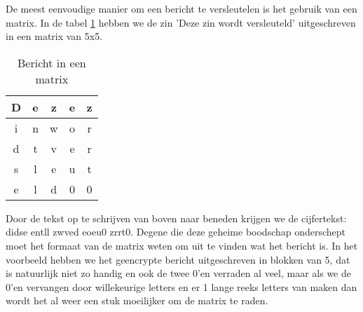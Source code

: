 De meest eenvoudige manier om een bericht te versleutelen is het gebruik van een matrix. In de tabel \ref{tab:matrix} hebben we de zin 'Deze zin wordt versleuteld' uitgeschreven in een matrix van 5x5.
\begin{table}[h]
\centering
\begin{tabular}{|c|c|c|c|c|}
\hline
	D &
	e &
	z &
	e &
	z \\
\hline
	i &
	n &
	w &
	o &
	r \\
\hline
	d &
	t &
	v &
	e &
	r \\
\hline
	s &
	l &
	e &
	u &
	t \\
\hline
	e &
	l &
	d &
	0 &
	0 \\
\hline
\end{tabular}
\caption{Bericht in een matrix}
\label{tab:matrix}
\end{table}
Door de tekst op te schrijven van boven naar beneden krijgen we de cijfertekst: didse entll zwved eoeu0 zrrt0. Degene die deze geheime boodschap onderschept moet het formaat van de matrix weten om uit te vinden wat het bericht is. In het voorbeeld hebben we het geencrypte bericht uitgeschreven in blokken van 5, dat is natuurlijk niet zo handig en ook de twee 0'en verraden al veel, maar als we de 0'en vervangen door willekeurige letters en er 1 lange reeks letters van maken dan wordt het al weer een stuk moeilijker om de matrix te raden.
